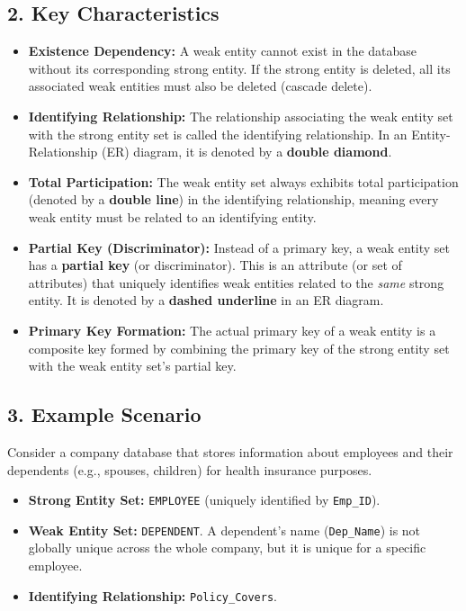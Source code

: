 \documentclass[12pt,a3paper]{article}
\begin{document}
\begin{enumerate}
\begin{tcolorbox}[enhanced,breakable,ansbox,colback=cA!4,colframe=cA,boxrule=0.8pt,arc=5pt,title={\textbf{Answer}},fonttitle=\bfseries\color{white},colbacktitle=cA]
\subsection*{2. Key Characteristics}
\begin{itemize}
    \item \textbf{Existence Dependency:} A weak entity cannot exist in the database without its corresponding strong entity. If the strong entity is deleted, all its associated weak entities must also be deleted (cascade delete).
    \item \textbf{Identifying Relationship:} The relationship associating the weak entity set with the strong entity set is called the identifying relationship. In an Entity-Relationship (ER) diagram, it is denoted by a \textbf{double diamond}.
    \item \textbf{Total Participation:} The weak entity set always exhibits total participation (denoted by a \textbf{double line}) in the identifying relationship, meaning every weak entity must be related to an identifying entity.
    \item \textbf{Partial Key (Discriminator):} Instead of a primary key, a weak entity set has a \textbf{partial key} (or discriminator). This is an attribute (or set of attributes) that uniquely identifies weak entities related to the \textit{same} strong entity. It is denoted by a \textbf{dashed underline} in an ER diagram.
    \item \textbf{Primary Key Formation:} The actual primary key of a weak entity is a composite key formed by combining the primary key of the strong entity set with the weak entity set's partial key.
\end{itemize}

\subsection*{3. Example Scenario}
Consider a company database that stores information about employees and their dependents (e.g., spouses, children) for health insurance purposes. 
\begin{itemize}
    \item \textbf{Strong Entity Set:} \texttt{EMPLOYEE} (uniquely identified by \texttt{Emp\_ID}).
    \item \textbf{Weak Entity Set:} \texttt{DEPENDENT}. A dependent's name (\texttt{Dep\_Name}) is not globally unique across the whole company, but it is unique for a specific employee. 
    \item \textbf{Identifying Relationship:} \texttt{Policy\_Covers}.
\end{itemize}


\end{tcolorbox}
\end{enumerate}
\end{document}
